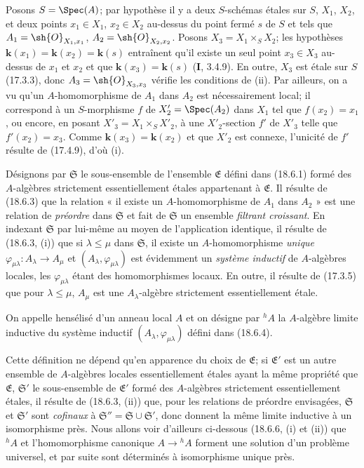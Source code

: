 Posons $S=\Spec(A)$; par hypothèse il y a deux $S$-schémas étales sur $S$, $X_1$, $X_2$, et deux points $x_1\in X_1$, $x_2\in X_2$ au-dessus du point fermé $s$ de $S$ et tels que $A_1=\sh{O}_{X_1,x_1}$, $A_2=\sh{O}_{X_2,x_2}$. Posons $X_3=X_1\times_S X_2$; les hypothèses $\boldsymbol{k}(x_1)=\boldsymbol{k}(x_2)=\boldsymbol{k}(s)$ entraînent qu'il existe un seul point $x_3\in X_3$ au-dessus de $x_1$ et $x_2$ et que $\boldsymbol{k}(x_3)=\boldsymbol{k}(s)$ (\textbf{I}, 3.4.9). En outre, $X_3$ est étale sur $S$ (17.3.3), donc $A_3=\sh{O}_{X_3,x_3}$ vérifie les conditions de (ii). Par ailleurs,
on a vu qu'un $A$-homomorphisme de $A_1$ dans $A_2$ est nécessairement local; il correspond à un $S$-morphisme $f$ de $X'_2=\Spec(A_2)$ dans $X_1$ tel que $f(x_2)=x_1$, ou encore, en posant $X'_3=X_1\times_S X'_2$, à une $X'_2$-section $f'$ de $X'_3$ telle que $f'(x_2)=x_3$. Comme $\boldsymbol{k}(x_3)=\boldsymbol{k}(x_2)$ et que $X'_2$ est connexe, l'unicité de $f'$ résulte de (17.4.9), d'où (i).

\begin{env}[18.6.4]
\label{IV.18.6.4}
Désignons par $\mathfrak S$ le sous-ensemble de l'ensemble $\mathfrak E$ défini dans (18.6.1) formé des $A$-algèbres strictement essentiellement étales appartenant à $\mathfrak E$. Il résulte de (18.6.3) que la relation « il existe un $A$-homomorphisme de $A_1$ dans $A_2$ » est une relation de \emph{préordre} dans $\mathfrak S$ et fait de $\mathfrak S$ un ensemble \emph{filtrant croissant}. En indexant $\mathfrak S$ par lui-même au moyen de l'application identique, il résulte de (18.6.3, (i)) que si $\lambda\leq\mu$ dans $\mathfrak S$, il existe un $A$-homomorphisme \emph{unique} $\varphi_{\mu\lambda}:A_\lambda\to A_\mu$ et $(A_\lambda,\varphi_{\mu\lambda})$ est évidemment un \emph{système inductif} de $A$-algèbres locales, les $\varphi_{\mu\lambda}$ étant des homomorphismes locaux. En outre, il résulte de (17.3.5) que pour $\lambda\leq\mu$, $A_\mu$ est une $A_\lambda$-algèbre strictement essentiellement étale.
\end{env}

\begin{definition}[18.6.5]
On appelle hensélisé d'un anneau local $A$ et on désigne par ${}^h\!A$ la $A$-algèbre limite inductive du système inductif $(A_\lambda,\varphi_{\mu\lambda})$ défini dans \textup{(18.6.4)}.
\end{definition}

Cette définition ne dépend qu'en apparence du choix de $\mathfrak E$; si $\mathfrak E'$ est un autre ensemble de $A$-algèbres locales essentiellement étales ayant la même propriété que $\mathfrak E$, $\mathfrak S'$ le sous-ensemble de $\mathfrak E'$ formé des $A$-algèbres strictement essentiellement étales, il résulte de (18.6.3, (ii)) que, pour les relations de préordre envisagées, $\mathfrak S$ et $\mathfrak S'$ sont \emph{cofinaux} à $\mathfrak S''=\mathfrak S\cup\mathfrak S'$, donc donnent la même limite inductive à un isomorphisme près. Nous allons voir d'ailleurs ci-dessous (18.6.6, (i) et (ii)) que ${}^h\!A$ et l'homomorphisme canonique $A\to{}^h\!A$ forment une solution d'un problème universel, et par suite sont déterminés à isomorphisme unique près.

